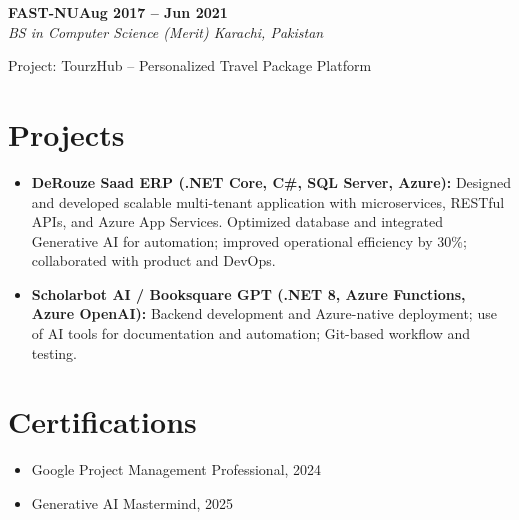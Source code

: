 \documentclass[letterpaper,10pt]{article}
\newcommand{\headingBf}[2]{
  \hspace{10pt}\textbf{#1}\hfill\textbf{#2}\\
}
\newcommand{\headingIt}[2]{
  \hspace{10pt}\textit{#1}\hfill\textit{#2}\\
}
\newenvironment{resume_list}{
  \vspace{-7pt}
  \begin{itemize}[itemsep=-2px, parsep=1pt, leftmargin=30pt]
}{
  \end{itemize}
}
\begin{document}
\headingBf{FAST-NU}{Aug 2017 -- Jun 2021}
\headingIt{BS in Computer Science (Merit) \hfill Karachi, Pakistan}{}
\begin{resume_list}
    \item Project: TourzHub -- Personalized Travel Package Platform
\end{resume_list}

\section{Projects}
\begin{itemize}
    \setlength\itemsep{3pt}
    \item \textbf{DeRouze Saad ERP (.NET Core, C\#, SQL Server, Azure):} Designed and developed scalable multi-tenant application with microservices, RESTful APIs, and Azure App Services. Optimized database and integrated Generative AI for automation; improved operational efficiency by 30\%; collaborated with product and DevOps.
    \item \textbf{Scholarbot AI / Booksquare GPT (.NET 8, Azure Functions, Azure OpenAI):} Backend development and Azure-native deployment; use of AI tools for documentation and automation; Git-based workflow and testing.
\end{itemize}

\section{Certifications}
\begin{itemize}
    \item Google Project Management Professional, 2024
    \item Generative AI Mastermind, 2025
\end{itemize}

\vspace*{\fill}
\end{document}
